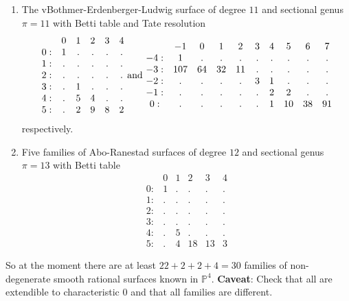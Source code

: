 \documentclass[twoside,12pt, leqno]{amsart}
\def\PP{{\mathbb P}}
\begin{document}
\begin{enumerate}
\item The vBothmer-Erdenberger-Ludwig surface of degree $11$ and sectional genus $\pi=11$ with Betti table and Tate resolution
$$\begin{matrix}
       & 0 & 1 & 2 & 3 & 4\\
      0: & 1 & . & . & . & .\\
      1: & . & . & . & . & .\\
      2: & . & . & . & . & .\\
      3: & . & 1 & . & . & .\\
      4: & . & 5 & 4 & . & .\\
      5: & . & 2 & 9 & 8 & 2
      \end{matrix}
\hbox{ and  } 
\begin{matrix}
        & -1 & 0 & 1 & 2 & 3 & 4 & 5 & 6 & 7\\
       -4: & 1 & . & . & . & . & . & . & . & .\\
       -3: & 107 & 64 & 32 & 11 & . & . & . & . & .\\
       -2: & . & . & . & . & 3 & 1 & . & . & .\\
       -1: & . & . & . & . & . & 2 & 2 & . & .\\
       0: & . & . & . & . & . & 1 & 10 & 38 & 91
       \end{matrix}
$$
respectively.

\item Five families of Abo-Ranestad surfaces of degree $12$ and sectional genus $\pi=13$ with Betti table
$$\begin{matrix}
       & 0 & 1 & 2 & 3 & 4\\
      0: & 1 & . & . & . & .\\
      1: & . & . & . & . & .\\
      2: & . & . & . & . & .\\
      3: & . & . & . & . & .\\
      4: & . & 5 & . & . & .\\
      5: & . & 4 & 18 & 13 & 3
      \end{matrix}$$
\end{enumerate}

So at the moment there are at least $22+2+2+4=30$ families of non-degenerate  smooth rational surfaces known in $\PP^{4}$.
{\bf Caveat}: Check that all are extendible to characteristic 0 and that all families are different.
\end{document}
